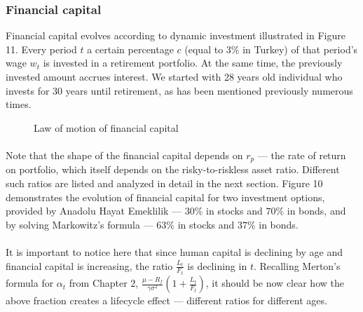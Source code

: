 \documentclass[]{article}
\begin{document}
\subsubsection{Financial capital}

Financial capital evolves according to dynamic investment illustrated in Figure 11. Every period $t$ a certain percentage $c$ (equal to $3\%$ in Turkey) of that period's wage $w_t$ is invested in a retirement portfolio. At the same time, the previously invested amount accrues interest. We started with 28 years old individual who invests for 30 years until retirement, as has been mentioned previously numerous times.

\begin{figure}[h]
	\centering
	\caption{Law of motion of financial capital}
\end{figure}

\paragraph{}Note that the shape of the financial capital depends on $r_p$ --- the rate of return on portfolio, which itself depends on the risky-to-riskless asset ratio. Different such ratios are listed and analyzed in detail in the next section. Figure 10 demonstrates the evolution of financial capital for two investment options, provided by Anadolu Hayat Emeklilik --- $30\%$ in stocks and $70\%$ in bonds, and by solving Markowitz's formula --- $63\%$ in stocks and $37\%$ in bonds.

\paragraph{}It is important to notice here that since human capital is declining by age and financial capital is increasing, the ratio $\frac{L_t}{F_t}$ is declining in $t$. Recalling Merton's formula for $\alpha_t$ from Chapter 2, $\frac{\mu - R_f}{\gamma \sigma^2}(1+\frac{L_t}{F_t})$, it should be now clear how the above fraction creates a lifecycle effect --- different ratios for different ages. 
\end{document}
